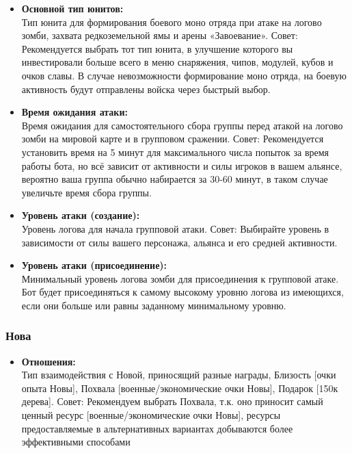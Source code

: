 \documentclass[
]{article}
\providecommand{\tightlist}{%
  \setlength{\itemsep}{0pt}\setlength{\parskip}{0pt}}
\begin{document}
\begin{itemize}
\item
  \textbf{Основной тип юнитов:}\\
  Тип юнита для формирования боевого моно отряда при атаке на логово
  зомби, захвата редкоземельной ямы и арены «Завоевание». Совет:
  Рекомендуется выбрать тот тип юнита, в улучшение которого вы
  инвестировали больше всего в меню снаряжения, чипов, модулей, кубов и
  очков славы. В случае невозможности формирование моно отряда, на
  боевую активность будут отправлены войска через быстрый выбор.
\item
  \textbf{Время ожидания атаки:}\\
  Время ожидания для самостоятельного сбора группы перед атакой на
  логово зомби на мировой карте и в групповом сражении. Совет:
  Рекомендуется установить время на 5 минут для максимального числа
  попыток за время работы бота, но всё зависит от активности и силы
  игроков в вашем альянсе, вероятно ваша группа обычно набирается за
  30-60 минут, в таком случае увеличьте время сбора группы.
\item
  \textbf{Уровень атаки (создание):}\\
  Уровень логова для начала групповой атаки. Совет: Выбирайте уровень в
  зависимости от силы вашего персонажа, альянса и его средней
  активности.
\item
  \textbf{Уровень атаки (присоединение):}\\
  Минимальный уровень логова зомби для присоединения к групповой атаке.
  Бот будет присоединяться к самому высокому уровню логова из имеющихся,
  если они больше или равны заданному минимальному уровню.
\end{itemize}

\subsubsection{Нова}\label{ux43dux43eux432ux430-1}

\begin{itemize}
\tightlist
\item
  \textbf{Отношения:}\\
  Тип взаимодействия с Новой, приносящий разные награды, Близость
  {[}очки опыта Новы{]}, Похвала {[}военные/экономические очки Новы{]},
  Подарок {[}150к дерева{]}. Совет: Рекомендуем выбрать Похвала, т.к.
  оно приносит самый ценный ресурс {[}военные/экономические очки
  Новы{]}, ресурсы предоставляемые в альтернативных вариантах добываются
  более эффективными способами
\end{itemize}
\end{document}
